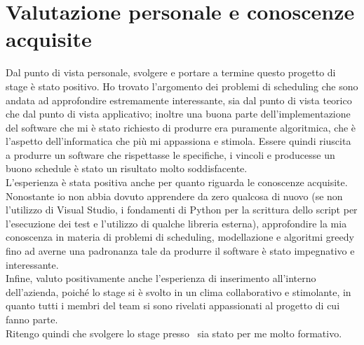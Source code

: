 \section{Valutazione personale e conoscenze acquisite}
Dal punto di vista personale, svolgere e portare a termine questo progetto di stage è stato positivo. Ho trovato l'argomento dei problemi di scheduling che sono andata ad approfondire estremamente interessante, sia dal punto di vista teorico che dal punto di vista applicativo; inoltre una buona parte dell'implementazione del software che mi è stato richiesto di produrre era puramente algoritmica, che è l'aspetto dell'informatica che più mi appassiona e stimola. Essere quindi riuscita a produrre un software che rispettasse le specifiche, i vincoli e producesse un buono schedule è stato un risultato molto soddisfacente.\\
L'esperienza è stata positiva anche per quanto riguarda le conoscenze acquisite. Nonostante io non abbia dovuto apprendere da zero qualcosa di nuovo (se non l'utilizzo di Visual Studio, i fondamenti di Python per la scrittura dello script per l'esecuzione dei test e l'utilizzo di qualche libreria esterna), approfondire la mia conoscenza in materia di problemi di scheduling, modellazione e algoritmi greedy fino ad averne una padronanza tale da produrre il software è stato impegnativo e interessante. \\
Infine, valuto positivamente anche l'esperienza di inserimento all'interno dell'azienda, poiché lo stage si è svolto in un clima collaborativo e stimolante, in quanto tutti i membri del team si sono rivelati appassionati al progetto di cui fanno parte.\\ Ritengo quindi che svolgere lo stage presso \TS\ sia stato per me molto formativo.

